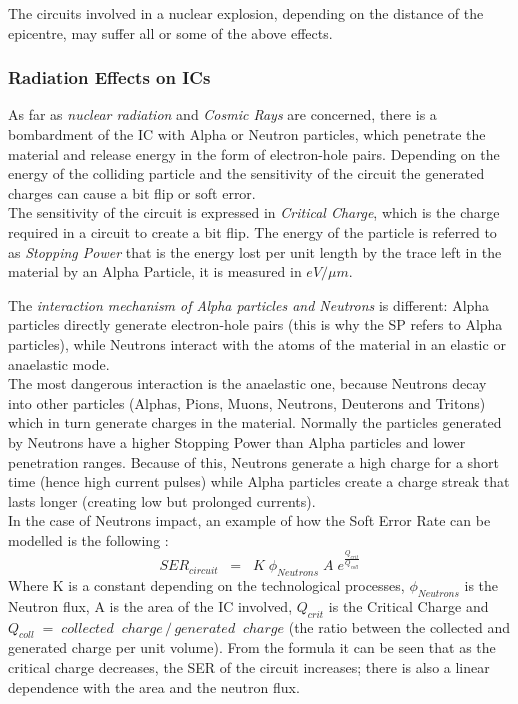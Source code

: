{{{{{					The circuits involved in a nuclear explosion, depending on the distance of the epicentre, may suffer all or some of the above effects.
				}%
			
			}%
		
		
			\subsubsection{Radiation Effects on ICs}{
				As far as \textit{nuclear radiation} and \textit{Cosmic Rays} are concerned, there is a bombardment of the IC with Alpha or Neutron particles, which penetrate the material and release energy in the form of electron-hole pairs. Depending on the energy of the colliding particle and the sensitivity of the circuit the generated charges can cause a bit flip or soft error. \\
				
				The sensitivity of the circuit is expressed in \textit{Critical Charge}, which is the charge required in a circuit to create a bit flip. The energy of the particle is referred to as \textit{Stopping Power} that is the energy lost per unit length by the trace left in the material by an Alpha Particle, it is measured in $eV/\mu m$.
				
				The\textit{ interaction mechanism of Alpha particles and Neutrons} is different: Alpha particles directly generate electron-hole pairs (this is why the SP refers to Alpha particles), while Neutrons interact with the atoms of the material in an elastic or anaelastic mode. \\
				
				The most dangerous interaction is the anaelastic one, because Neutrons decay into other particles (Alphas, Pions, Muons, Neutrons, Deuterons and Tritons) which in turn generate charges in the material. Normally the particles generated by Neutrons have a higher Stopping Power than Alpha particles and lower penetration ranges. Because of this, Neutrons generate a high charge for a short time (hence high current pulses) while Alpha particles create a charge streak that lasts longer (creating low but prolonged currents).\\
				
				In the case of Neutrons impact, an example of how the Soft Error Rate can be modelled is the following :
				\begin{equation} \label{SER_Neutron}
				SER_{circuit}\;\;= \;\;K\;\phi_{Neutrons}\;A\;e^{\frac{Q_{crit}}{Q_{coll}}}
				\end{equation}
				Where K is a constant depending on the technological processes, $\phi_{Neutrons}$ is the Neutron flux, A is the area of the IC involved, $Q_{crit}$ is the Critical Charge and $Q_{coll}\;=\;collected\;\;charge\,/\,generated\;\;charge$ (the ratio between the collected and generated charge per unit volume). From the formula  it can be seen that as the critical charge decreases, the SER of the circuit increases; there is also a linear dependence with the area and the neutron flux.\\
				
}}}}
